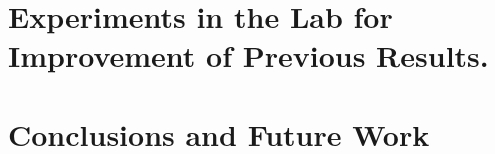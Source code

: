 \documentclass[10pt]{report}
\begin{document}
\chapter{Experiments in the Lab for Improvement of Previous Results.}

\chapter{Conclusions and Future Work}

\appendix
\appendixpage




\end{document}
